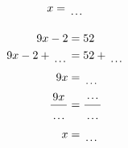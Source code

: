 \documentclass[12pt]{article}
\newcounter{minipagecount}
\begin{document}
\begin{multicols}{2}
\begin{minipage}[t]{0.45\textwidth}
\begin{align*}
        x &= \dotuline{\hspace{5mm}}\\
    \end{align*}
\end{minipage} %
\noindent{(\theminipagecount)}\hspace{0.1mm} %
\begin{minipage}[t]{0.45\textwidth} %
    \vspace{-26pt}  %
    \raggedright %
    \begin{align*} %
        9x - 2 &= 52\\
        9x - 2 + \dotuline{\hspace{5mm}} &= 52 + \dotuline{\hspace{5mm}}\\
        9x &= \dotuline{\hspace{5mm}}\\
        \frac{9x}{\dotuline{\hspace{5mm}}} &= \frac{\dotuline{\hspace{5mm}}}{\dotuline{\hspace{5mm}}}\\
        x &= \dotuline{\hspace{5mm}}\\
    \end{align*}
\end{minipage} %
\noindent{(\theminipagecount)}\hspace{0.1mm} %
\begin{minipage}[t]{0.45\textwidth} %
    \vspace{-26pt}  %

\end{minipage}
\end{multicols}
\end{document}
